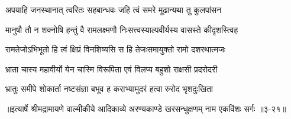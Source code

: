 \twolineshloka
{अपयाहि जनस्थानात् त्वरितः सहबान्धवः}
{जहि त्वं समरे मूढान्यथा तु कुलपांसन} %

\twolineshloka
{मानुषौ तौ न शक्नोषि हन्तुं वै रामलक्ष्मणौ}
{निःसत्त्वस्याल्पवीर्यस्य वासस्ते कीदृशस्त्विह} %

\twolineshloka
{रामतेजोऽभिभूतो हि त्वं क्षिप्रं विनशिष्यसि}
{स हि तेजःसमायुक्तो रामो दशरथात्मजः} %

\twolineshloka
{भ्राता चास्य महावीर्यो येन चास्मि विरूपिता}
{एवं विलप्य बहुशो राक्षसी प्रदरोदरी} %

\twolineshloka
{भ्रातुः समीपे शोकार्ता नष्टसंज्ञा बभूव ह}
{कराभ्यामुदरं हत्वा रुरोद भृशदुःखिता} %


॥इत्यार्षे श्रीमद्रामायणे वाल्मीकीये आदिकाव्ये अरण्यकाण्डे खरसन्धुक्षणम् नाम एकविंशः सर्गः ॥३-२१॥
